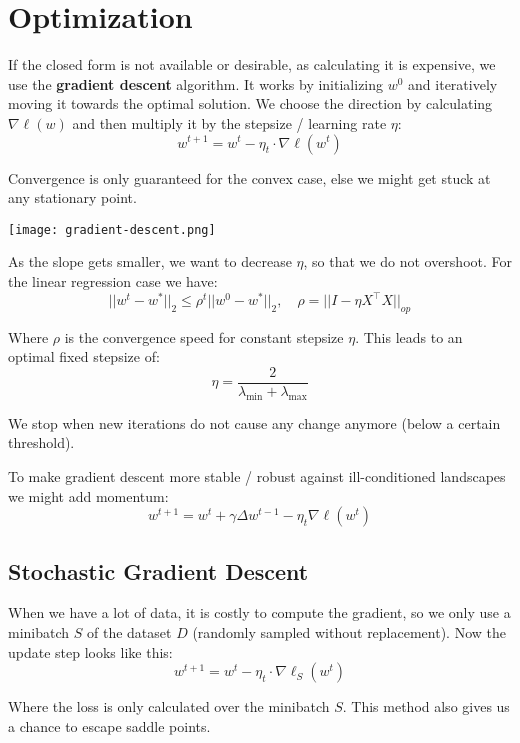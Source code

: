 \section{Optimization}

If the closed form is not available or desirable, as calculating it is expensive, we use the \textbf{gradient descent} algorithm. It works by initializing $w^0$ and iteratively moving it towards the optimal solution. We choose the direction by calculating $\nabla \ell(w)$ and then multiply it by the stepsize / learning rate $\eta$:
$$w^{t+1} = w^t - \eta_t \cdot \nabla \ell(w^t)$$

Convergence is only guaranteed for the convex case, else we might get stuck at any stationary point. 

\begin{center}
	\texttt{[image: gradient-descent.png]}
\end{center}

As the slope gets smaller, we want to decrease $\eta$, so that we do not overshoot. For the linear regression case we have:
$$||w^t - w^*||_2 \leq \rho^t ||w^0 - w^*||_2, \quad \rho = ||I - \eta X^\top X||_{op}$$

Where $\rho$ is the convergence speed for constant stepsize $\eta$. This leads to an optimal fixed stepsize of:
$$\eta = \frac{2}{\lambda_{\text{min}} + \lambda_{\text{max}}}$$

We stop when new iterations do not cause any change anymore (below a certain threshold).

To make gradient descent more stable / robust against ill-conditioned landscapes we might add momentum:
$$w^{t+1} = w^t + \gamma \Delta w^{t-1} - \eta_t \nabla \ell(w^t)$$

\subsection{Stochastic Gradient Descent}

When we have a lot of data, it is costly to compute the gradient, so we only use a minibatch $S$ of the dataset $D$ (randomly sampled without replacement). Now the update step looks like this:
$$w^{t+1} = w^t - \eta_t \cdot \nabla \ell_S(w^t)$$

Where the loss is only calculated over the minibatch $S$. This method also gives us a chance to escape saddle points.